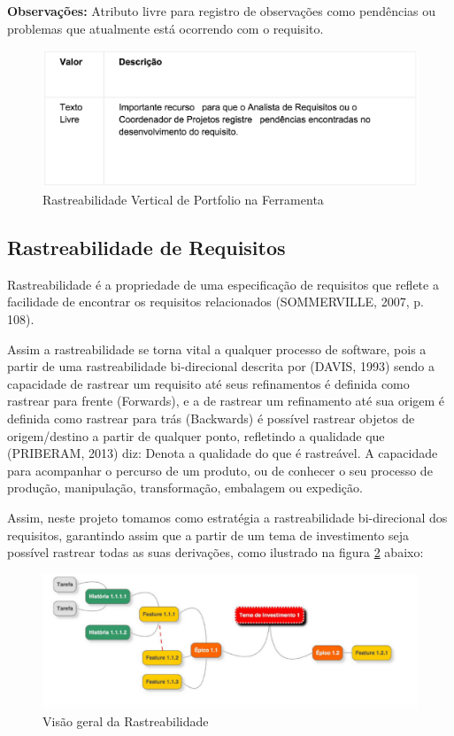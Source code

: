 \textbf{Observações:} Atributo livre para registro de observações como pendências
ou problemas que atualmente está ocorrendo com o requisito.

\begin{figure}[H]
    \centering
	\includegraphics[keepaspectratio=true,scale=0.5]{figuras/atr6.eps}
    \caption{ Rastreabilidade Vertical de Portfolio na Ferramenta}
    \label{fig:ras}
\end{figure}

\subsection{Rastreabilidade de Requisitos}

Rastreabilidade é a propriedade de uma especificação de requisitos que reflete a facilidade
de encontrar os requisitos relacionados (SOMMERVILLE, 2007, p. 108).

Assim a rastreabilidade se torna vital a qualquer processo de software,
pois a partir de uma rastreabilidade bi-direcional descrita por (DAVIS, 1993) sendo
a capacidade de rastrear um requisito até seus refinamentos é definida como rastrear
para frente (Forwards), e a de rastrear um refinamento até sua origem é definida como
rastrear para trás (Backwards) é possível rastrear objetos de origem/destino a partir de
qualquer ponto, refletindo a qualidade que (PRIBERAM, 2013) diz: Denota a qualidade do
que é rastreável. A capacidade para acompanhar o percurso de um produto, ou de conhecer
o seu processo de produção, manipulação, transformação, embalagem ou expedição.

Assim, neste projeto tomamos como estratégia a rastreabilidade bi-direcional dos
requisitos, garantindo assim que a partir de um tema de investimento seja possível
rastrear todas as suas derivações, como ilustrado na figura \ref{fig:ras1} abaixo:

\begin{figure}[H]
    \centering
	\includegraphics[keepaspectratio=true,scale=0.5]{figuras/rast1.eps}
    \caption{Visão geral da Rastreabilidade}
    \label{fig:ras1}
\end{figure}

